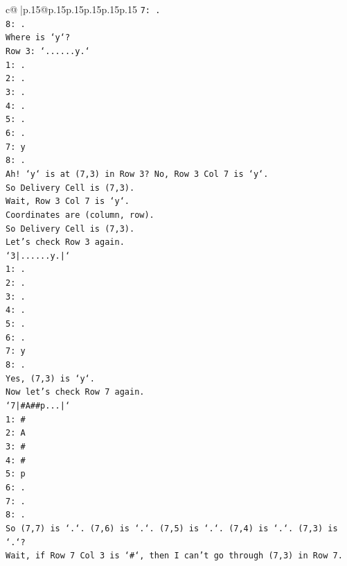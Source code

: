 \documentclass{article}
\begin{document}
{\begin{supertabular}{c@{$\;$}|p{.15\linewidth}@{}p{.15\linewidth}p{.15\linewidth}p{.15\linewidth}p{.15\linewidth}p{.15\linewidth}}
{{{\texttt{7: .} \\
\texttt{8: .} \\
\texttt{Where is `y`?} \\
\texttt{Row 3: `......y.`} \\
\texttt{1: .} \\
\texttt{2: .} \\
\texttt{3: .} \\
\texttt{4: .} \\
\texttt{5: .} \\
\texttt{6: .} \\
\texttt{7: y} \\
\texttt{8: .} \\
\texttt{Ah! `y` is at (7,3) in Row 3? No, Row 3 Col 7 is `y`.} \\
\texttt{So Delivery Cell is (7,3).} \\
\texttt{Wait, Row 3 Col 7 is `y`.} \\
\texttt{Coordinates are (column, row).} \\
\texttt{So Delivery Cell is (7,3).} \\
\texttt{Let's check Row 3 again.} \\
\texttt{`3|......y.|`} \\
\texttt{1: .} \\
\texttt{2: .} \\
\texttt{3: .} \\
\texttt{4: .} \\
\texttt{5: .} \\
\texttt{6: .} \\
\texttt{7: y} \\
\texttt{8: .} \\
\texttt{Yes, (7,3) is `y`.} \\
\texttt{Now let's check Row 7 again.} \\
\texttt{`7|\#A\#\#p...|`} \\
\texttt{1: \#} \\
\texttt{2: A} \\
\texttt{3: \#} \\
\texttt{4: \#} \\
\texttt{5: p} \\
\texttt{6: .} \\
\texttt{7: .} \\
\texttt{8: .} \\
\texttt{So (7,7) is `.`. (7,6) is `.`. (7,5) is `.`. (7,4) is `.`. (7,3) is `.`?} \\
\texttt{Wait, if Row 7 Col 3 is `\#`, then I can't go through (7,3) in Row 7.} \\
}}}
\end{supertabular}}
\end{document}

